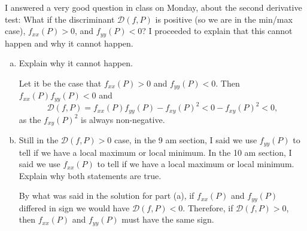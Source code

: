 \begin{problem}
  I answered a very good question in class on Monday, about the second derivative test: What if the discriminant $\mathcal D(f,P)$ is positive (so we are in the min/max case), $f_{xx}(P)>0$, and $f_{yy}(P)<0$? I proceeded to explain that this cannot happen and why it cannot happen.

  \begin{enumerate}[(a)]
    \item Explain why it cannot happen.
    \begin{solution}
      Let it be the case that $f_{xx}(P)>0$ and $f_{yy}(P)<0$. Then $f_{xx}(P)f_{yy}(P)<0$ and
      \[\mathcal D(f,P)=f_{xx}(P)f_{yy}(P)-f_{xy}(P)^2<0-f_{xy}(P)^2<0,\]
      as the $f_{xy}(P)^2$ is always non-negative.
    \end{solution}
    \item Still in the $\mathcal D(f,P)>0$ case, in the 9 am section, I said we use $f_{yy}(P)$ to tell if we have a local maximum or local minimum. In the 10 am section, I said we use $f_{xx}(P)$ to tell if we have a local maximum or local minimum. Explain why both statements are true.
    \begin{solution}
      By what was said in the solution for part (a), if $f_{xx}(P)$ and $f_{yy}(P)$ differed in sign we would have $\mathcal D(f,P)<0$. Therefore, if $\mathcal D(f,P)>0$, then $f_{xx}(P)$ and $f_{yy}(P)$ must have the same sign.
    \end{solution}
  \end{enumerate}
\end{problem}

